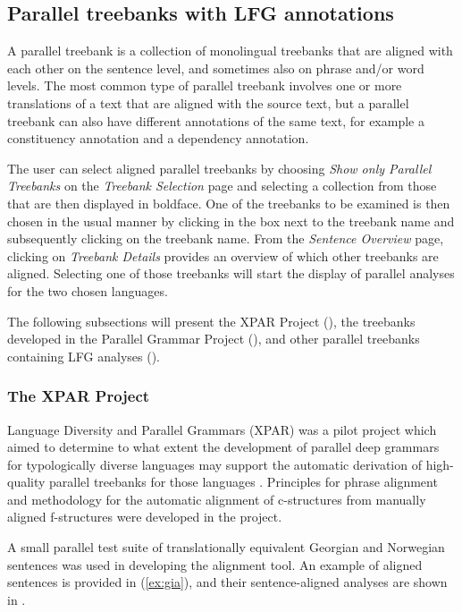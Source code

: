 \documentclass[output=paper,hidelinks]{langscibook}
\begin{document}
\subsection{Parallel treebanks with LFG annotations}\label{parallel}

A parallel treebank is a collection of monolingual treebanks that are aligned with each other on the sentence level, and sometimes also on phrase and/or word levels.
The most common type of parallel treebank involves one or more translations of a text that are aligned with the source text, but a parallel treebank can also have different annotations of the same text, for example a constituency annotation and a dependency annotation.

The user can select aligned parallel treebanks by choosing \textit{Show only Parallel Treebanks} on the \emph{Treebank Selection} page and selecting a collection from those that are then displayed in boldface.
One of the treebanks to be examined is then chosen in the usual manner by clicking in the box next to the treebank name and subsequently clicking on the treebank name.
From the \emph{Sentence Overview} page, clicking on \emph{Treebank Details} provides an overview of which other treebanks are aligned.
Selecting one of those treebanks will start the display of parallel analyses for the two chosen languages.

The following subsections will present the XPAR Project (), the treebanks developed in the Parallel Grammar Project (), and other parallel treebanks containing LFG analyses ().

\subsubsection{The XPAR Project}\label{xpar}

Language Diversity and Parallel Grammars (XPAR) was a pilot project which aimed to determine to what extent the development of parallel deep grammars for typologically diverse languages may support the automatic derivation of high-quality parallel treebanks for those languages \citep{Dyvik09}.
Principles for phrase alignment and methodology for the automatic alignment of c-structures from manually aligned f-structures were developed in the project.

A small parallel test suite of translationally equivalent Georgian and Norwegian sentences was used in developing the alignment tool.
An example of aligned sentences is provided in (\ref{ex:gia}), and their sentence-aligned analyses are shown in .
\end{document}
